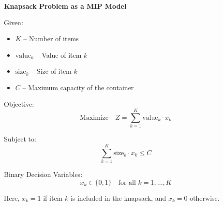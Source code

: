 \documentclass{article}
\begin{document}
\textbf{Knapsack Problem as a MIP Model}

Given:
\begin{itemize}
    \item \( K \) – Number of items
    \item \( \text{value}_k \) – Value of item \( k \)
    \item \( \text{size}_k \) – Size of item \( k \)
    \item \( C \) – Maximum capacity of the container
\end{itemize}

Objective:
\[
\text{Maximize} \quad Z = \sum_{k=1}^{K} \text{value}_k \cdot x_k
\]

Subject to:
\[
\sum_{k=1}^{K} \text{size}_k \cdot x_k \leq C
\]

Binary Decision Variables:
\[
x_k \in \{0, 1\} \quad \text{for all } k = 1, \ldots, K
\]

Here, \( x_k = 1 \) if item \( k \) is included in the knapsack, and \( x_k = 0 \) otherwise.
\end{document}
